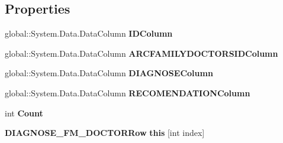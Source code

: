 \subsection*{Properties}
\begin{CompactItemize}
\item 
global::System.Data.DataColumn \textbf{IDColumn}\hspace{0.3cm}{\tt  [get]}\label{class_automatic_medical_system_1_1_data_set1_1_1_d_i_a_g_n_o_s_e___f_m___d_o_c_t_o_r_data_table_518e6b4dfd5687bd2a6e492ee134437f}

\item 
global::System.Data.DataColumn \textbf{ARCFAMILYDOCTORSIDColumn}\hspace{0.3cm}{\tt  [get]}\label{class_automatic_medical_system_1_1_data_set1_1_1_d_i_a_g_n_o_s_e___f_m___d_o_c_t_o_r_data_table_8b3c08c25dcf0565ec349bb0d45a62ff}

\item 
global::System.Data.DataColumn \textbf{DIAGNOSEColumn}\hspace{0.3cm}{\tt  [get]}\label{class_automatic_medical_system_1_1_data_set1_1_1_d_i_a_g_n_o_s_e___f_m___d_o_c_t_o_r_data_table_79991cc114308c96cdbd84d71353e4c1}

\item 
global::System.Data.DataColumn \textbf{RECOMENDATIONColumn}\hspace{0.3cm}{\tt  [get]}\label{class_automatic_medical_system_1_1_data_set1_1_1_d_i_a_g_n_o_s_e___f_m___d_o_c_t_o_r_data_table_5448315f60e0a88d8cb619992722fc12}

\item 
int \textbf{Count}\hspace{0.3cm}{\tt  [get]}\label{class_automatic_medical_system_1_1_data_set1_1_1_d_i_a_g_n_o_s_e___f_m___d_o_c_t_o_r_data_table_d11924e4a976bc7187148868828e9d9d}

\item 
{\bf DIAGNOSE\_\-FM\_\-DOCTORRow} \textbf{this} [int index]\hspace{0.3cm}{\tt  [get]}\label{class_automatic_medical_system_1_1_data_set1_1_1_d_i_a_g_n_o_s_e___f_m___d_o_c_t_o_r_data_table_261a3942ba89cbc1bad8e2e61f397655}

\end{CompactItemize}
